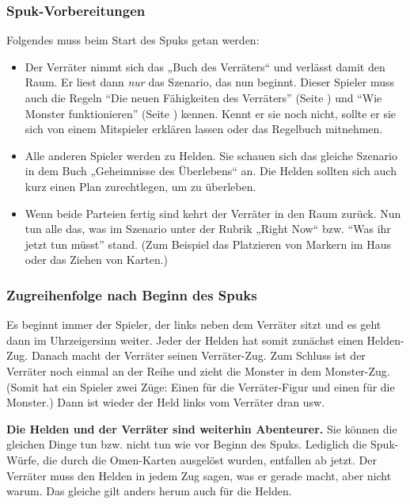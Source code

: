 \subsubsection{Spuk-Vorbereitungen}

Folgendes muss beim Start des Spuks getan werden:

\begin{itemize}
    \item Der Verräter nimmt sich das „Buch des Verräters“ und verlässt damit den Raum. Er liest dann \emph{nur} das Szenario, das nun beginnt. Dieser Spieler muss auch die Regeln ``Die neuen Fähigkeiten des Verräters'' (Seite \pageref{kap:rule:newtraitorpowers}) und ``Wie Monster funktionieren'' (Seite \pageref{kap:rules:monsters}) kennen. Kennt er sie noch nicht, sollte er sie sich von einem Mitspieler erklären lassen oder das Regelbuch mitnehmen.
    \item Alle anderen Spieler werden zu Helden. Sie schauen sich das gleiche Szenario in dem Buch „Geheimnisse des Überlebens“ an. Die Helden sollten sich auch kurz einen Plan zurechtlegen, um zu überleben.
    \item Wenn beide Parteien fertig sind kehrt der Verräter in den Raum zurück. Nun tun alle das, was im Szenario unter der Rubrik „Right Now“ bzw. ``Was ihr jetzt tun müsst'' stand. (Zum Beispiel das Platzieren von Markern im Haus oder das Ziehen von Karten.)
\end{itemize}

\subsubsection{Zugreihenfolge nach Beginn des Spuks}

Es beginnt immer der Spieler, der links neben dem Verräter sitzt und es geht dann im Uhrzeigersinn weiter. Jeder der Helden hat somit zunächst einen Helden-Zug. Danach macht der Verräter seinen Verräter-Zug. Zum Schluss ist der Verräter noch einmal an der Reihe und zieht die Monster in dem Monster-Zug. (Somit hat ein Spieler zwei Züge: Einen für die Verräter-Figur und einen für die Monster.) Dann ist wieder der Held links vom Verräter dran usw.

\textbf{Die Helden und der Verräter sind weiterhin Abenteurer.} Sie können die gleichen Dinge tun bzw. nicht tun wie vor Beginn des Spuks. Lediglich die Spuk-Würfe, die durch die Omen-Karten ausgelöst wurden, entfallen ab jetzt. Der Verräter muss den Helden in jedem Zug sagen, was er gerade macht, aber nicht warum. Das gleiche gilt anders herum auch für die Helden.

